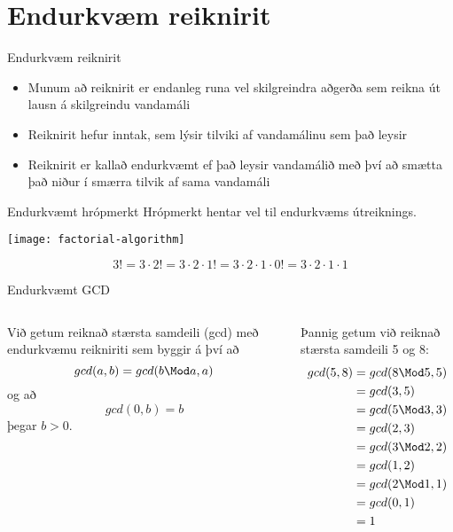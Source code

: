 \documentclass{beamer}
\begin{document}
\section{Endurkvæm reiknirit}

\begin{frame}{Endurkvæm reiknirit}
\begin{itemize}
 \item Munum að reiknirit er endanleg runa vel skilgreindra aðgerða sem reikna út lausn á skilgreindu vandamáli
 \item Reiknirit hefur inntak, sem lýsir tilviki af vandamálinu sem það leysir
 \item Reiknirit er kallað endurkvæmt ef það leysir vandamálið með því að smætta það niður í smærra tilvik af sama vandamáli
\end{itemize}
\end{frame}

\begin{frame}{Endurkvæmt hrópmerkt}
Hrópmerkt hentar vel til endurkvæms útreiknings.
\begin{center}
\texttt{[image: factorial-algorithm]}
\end{center}
\[
3! = 3\cdot 2! = 3 \cdot 2 \cdot 1! = 3 \cdot 2 \cdot 1 \cdot 0! = 3 \cdot 2 \cdot 1 \cdot 1
\]
\end{frame}

\begin{frame}{Endurkvæmt GCD}
\begin{columns}
Við getum reiknað stærsta samdeili (gcd) með endurkvæmu reikniriti sem byggir á því að 
\[
 gcd(a,b) = gcd(b \Mod a, a)
\]
og að 
\[
 gcd(0,b) = b
\]
þegar $b > 0$.

\vspace{0.5cm}
Þannig getum við reiknað stærsta samdeili 5 og 8:
\begin{align*}
gcd(5,8) &= gcd(8 \Mod 5, 5)\\
&= gcd(3,5)\\
&= gcd(5 \Mod 3, 3)\\
&= gcd(2,3)\\
&= gcd(3 \Mod 2, 2)\\
&= gcd(1,2)\\
&= gcd(2 \Mod 1, 1)\\
&= gcd(0,1)\\
&= 1
\end{align*}

\end{columns}
\end{frame}
\end{document}
